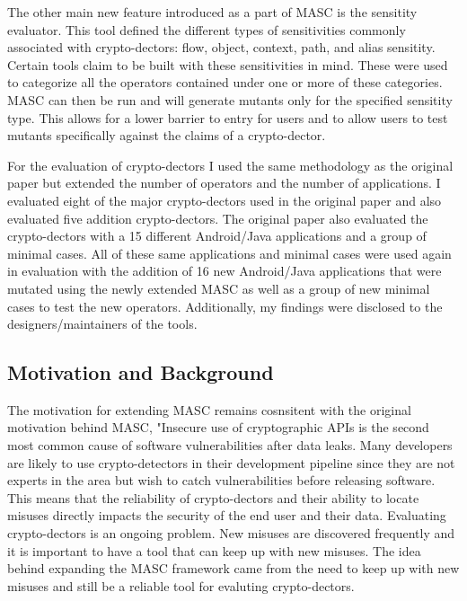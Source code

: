 The other main new feature introduced as a part of MASC is the sensitity evaluator. This tool defined the different types of sensitivities commonly associated with crypto-dectors: flow, object, context, path, and alias sensitity. Certain tools claim to be built with these sensitivities in mind. These were used to categorize all the operators contained under one or more of these categories. MASC can then be run and will generate mutants only for the specified sensitity type. This allows for a lower barrier to entry for users and to allow users to test mutants specifically against the claims of a crypto-dector. 

For the evaluation of crypto-dectors I used the same methodology as the original paper but extended the number of operators and the number of applications. I evaluated eight of the major crypto-dectors used in the original paper and also evaluated five addition crypto-dectors. The original paper also evaluated the crypto-dectors with a 15 different Android/Java applications and a group of minimal cases. All of these same applications and minimal cases were used again in evaluation with the addition of 16 new Android/Java applications that were mutated using the newly extended MASC as well as a group of new minimal cases to test the new operators. Additionally, my findings were disclosed to the designers/maintainers of the tools. 


\subsection{Motivation and Background}
\label{ch1:subsec:motivation}

The motivation for extending MASC remains cosnsitent with the original motivation behind MASC, "Insecure use of cryptographic APIs is the second most common cause of software vulnerabilities after data leaks. Many developers are likely to use crypto-detectors in their development pipeline since they are not experts in the area but wish to catch vulnerabilities before releasing software. This means that the reliability of crypto-dectors and their ability to locate misuses directly impacts the security of the end user and their data. Evaluating crypto-dectors is an ongoing problem. New misuses are discovered frequently and it is important to have a tool that can keep up with new misuses. The idea behind expanding the MASC framework came from the need to keep up with new misuses and still be a reliable tool for evaluting crypto-dectors. 

